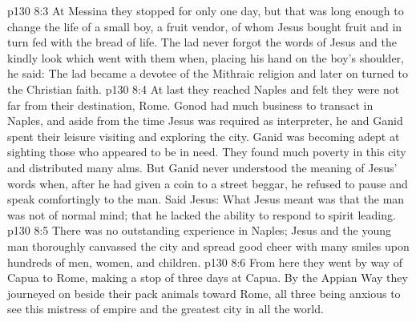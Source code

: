 \vs p130 8:3 \pc At Messina they stopped for only one day, but that was long enough to change the life of a small boy, a fruit vendor, of whom Jesus bought fruit and in turn fed with the bread of life. The lad never forgot the words of Jesus and the kindly look which went with them when, placing his hand on the boy’s shoulder, he said:  The lad became a devotee of the Mithraic religion and later on turned to the Christian faith.
\vs p130 8:4 \pc At last they reached Naples and felt they were not far from their destination, Rome. Gonod had much business to transact in Naples, and aside from the time Jesus was required as interpreter, he and Ganid spent their leisure visiting and exploring the city. Ganid was becoming adept at sighting those who appeared to be in need. They found much poverty in this city and distributed many alms. But Ganid never understood the meaning of Jesus’ words when, after he had given a coin to a street beggar, he refused to pause and speak comfortingly to the man. Said Jesus:  What Jesus meant was that the man was not of normal mind; that he lacked the ability to respond to spirit leading.
\vs p130 8:5 There was no outstanding experience in Naples; Jesus and the young man thoroughly canvassed the city and spread good cheer with many smiles upon hundreds of men, women, and children.
\vs p130 8:6 From here they went by way of Capua to Rome, making a stop of three days at Capua. By the Appian Way they journeyed on beside their pack animals toward Rome, all three being anxious to see this mistress of empire and the greatest city in all the world.
\quizlink
